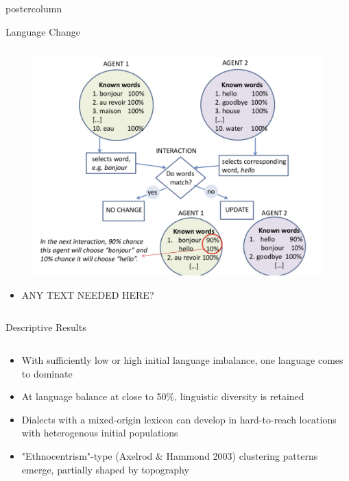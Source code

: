 \documentclass[final,hyperref={pdfpagelabels=false}]{beamer}
\begin{document}
\begin{frame}
\begin{columns}
\begin{column}{.33\textwidth}
\begin{beamercolorbox}[center,wd=\textwidth]{postercolumn}
\begin{minipage}[T]{.95\textwidth}
{            \begin{block}{Language Change}
              \begin{columns}
                \begin{column}{.99\textwidth}
                  \begin{figure}
                    \centering
                    \includegraphics[width=0.80\linewidth]{images/language_change_model}
                  \end{figure}
                  \begin{itemize}
                    \item ANY TEXT NEEDED HERE?
                  \end{itemize}
                \end{column}
              \end{columns}
            \end{block}
            \vfill
            \begin{block}{Descriptive Results}
              \begin{columns}
                \begin{column}{.99\textwidth}
                  \begin{itemize}
                    \item With sufficiently low or high initial language imbalance, one language comes to dominate
                    \item At language balance at close to 50\%, linguistic diversity is retained
                    \item Dialects with a mixed-origin lexicon can develop in hard-to-reach locations with heterogenous initial populations
                    \item "Ethnocentrism"-type (Axelrod \& Hammond 2003) clustering patterns emerge, partially shaped by topography

\end{itemize}
\end{column}
\end{columns}
\end{block}}
\end{minipage}
\end{beamercolorbox}
\end{column}
\end{columns}
\end{frame}
\end{document}
